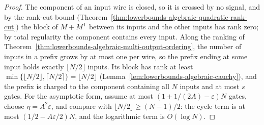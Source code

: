 \begin{proof}
  \leanok
  The component of an input wire is closed, so it is crossed by no signal,
  and by the rank-cut bound
  (Theorem~\ref{thm:lowerbounds-algebraic-quadratic-rank-cut}) the block of
  $M+M^{\mathsf T}$ between its inputs and the other inputs has rank zero;
  by total regularity the component contains every input. Along the ranking
  of Theorem~\ref{thm:lowerbounds-algebraic-multi-output-ordering}, the
  number of inputs in a prefix grows by at most one per wire, so the prefix
  ending at some input holds exactly $\lfloor N/2\rfloor$ inputs. Its block
  has rank at least $\min\{\lfloor N/2\rfloor,\lceil N/2\rceil\}=\lfloor
  N/2\rfloor$ (Lemma~\ref{lem:lowerbounds-algebraic-cauchy}), and the prefix
  is charged to the component containing all $N$ inputs and at most $s$
  gates. For the asymptotic form, assume at most $(1+1/(2A)-\varepsilon)N$
  gates, choose $\eta=A^2\varepsilon$, and compare with
  $\lfloor N/2\rfloor\ge(N-1)/2$: the cycle term is at most
  $(1/2-A\varepsilon/2)N$, and the logarithmic term is $O(\log N)$.
\end{proof}

